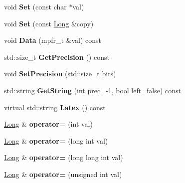 \begin{DoxyCompactItemize}
void {\bfseries Set} (const char $\ast$val)
\item 
\mbox{\label{classradix_1_1Long_a24830514ccb8e24e8db8dbf6b9712f5e}} 
void {\bfseries Set} (const \hyperlink{classradix_1_1Long}{Long} \&copy)
\item 
\mbox{\label{classradix_1_1Long_ab948f973d129d3e8b592efd0db502326}} 
void {\bfseries Data} (mpfr\+\_\+t \&val) const
\item 
\mbox{\label{classradix_1_1Long_af675e7bbffadb7cb8b5c53f70ac65f22}} 
std\+::size\+\_\+t {\bfseries Get\+Precision} () const
\item 
\mbox{\label{classradix_1_1Long_a0fc977c188e5a7fd78e82290d266b60a}} 
void {\bfseries Set\+Precision} (std\+::size\+\_\+t bits)
\item 
\mbox{\label{classradix_1_1Long_a59f6736ef10308cc24379d32a38d4adb}} 
std\+::string {\bfseries Get\+String} (int prec=-\/1, bool left=false) const
\item 
\mbox{\label{classradix_1_1Long_a6a1ac9d31d581b9d448595dfa0c4cb2b}} 
virtual std\+::string {\bfseries Latex} () const
\item 
\mbox{\label{classradix_1_1Long_ad99cd1f4544f64a507ea5b8d7d3debc4}} 
\hyperlink{classradix_1_1Long}{Long} \& {\bfseries operator=} (int val)
\item 
\mbox{\label{classradix_1_1Long_af9ec8fca0048e12e980a58e75ac79a9d}} 
\hyperlink{classradix_1_1Long}{Long} \& {\bfseries operator=} (long int val)
\item 
\mbox{\label{classradix_1_1Long_a0d099f53a1f660ede70682a5694c22cd}} 
\hyperlink{classradix_1_1Long}{Long} \& {\bfseries operator=} (long long int val)
\item 
\mbox{\label{classradix_1_1Long_ac7df3c49fee561843da1825529c50729}} 
\hyperlink{classradix_1_1Long}{Long} \& {\bfseries operator=} (unsigned int val)
\item 
\mbox{\label{classradix_1_1Long_ad809ddec119b8813f92e84f532857f83}} 

\end{DoxyCompactItemize}
